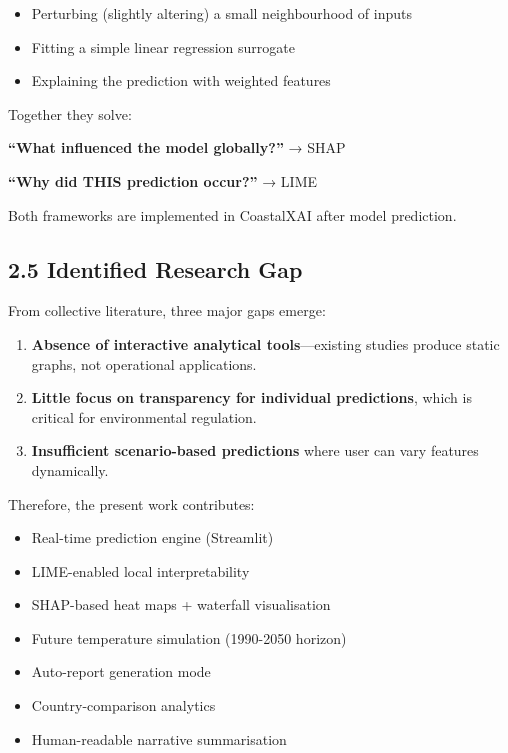 \documentclass[12pt, a4paper]{article}
\begin{document}
\begin{itemize}
    \item Perturbing (slightly altering) a small neighbourhood of inputs
    \item Fitting a simple linear regression surrogate
    \item Explaining the prediction with weighted features
\end{itemize}

Together they solve:

\begin{center}
    \textbf{“What influenced the model globally?”} → SHAP  

    \textbf{“Why did THIS prediction occur?”} → LIME
\end{center}

Both frameworks are implemented in CoastalXAI after model prediction.

\subsection{\textbf{2.5 Identified Research Gap}}

From collective literature, three major gaps emerge:

\begin{enumerate}
    \item \textbf{Absence of interactive analytical tools}—existing studies produce static graphs, not operational applications.
    \item \textbf{Little focus on transparency for individual predictions}, which is critical for environmental regulation.
    \item \textbf{Insufficient scenario-based predictions} where user can vary features dynamically.
\end{enumerate}

Therefore, the present work contributes:

\begin{itemize}
    \item Real-time prediction engine (Streamlit)
    \item LIME-enabled local interpretability
    \item SHAP-based heat maps + waterfall visualisation
    \item Future temperature simulation (1990-2050 horizon)
    \item Auto-report generation mode
    \item Country-comparison analytics
    \item Human-readable narrative summarisation
\end{itemize}
\end{document}
